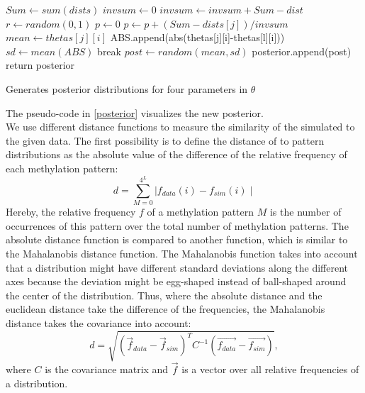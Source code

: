 \begin{algorithm}
\begin{algorithmic}
 
	\State $Sum \gets sum(dists)$
	\State $invsum \gets 0$
		\State $invsum \gets invsum + Sum - dist$
	\EndFor
	\State $r \gets random(0,1)$
	\State $p \gets 0$
		\State $p \gets p + (Sum - dists[j])/invsum$
			\State $mean \gets thetas[j][i]$
				\State ABS.append(abs(thetas[j][i]-thetas[l][i]))
			\EndFor
			\State $sd \gets mean(ABS)$
			\State break
		\EndIf
		\State $post \gets random(mean, sd)$
		\State posterior.append(post)
	\EndFor
\EndFor
\State return posterior
\EndProcedure
\end{algorithmic}
\caption{\label{posterior} Generates posterior distributions for four parameters in $\theta$}
\end{algorithm}
The pseudo-code in \ref{posterior} visualizes the new posterior.\\

We use different distance functions to measure the similarity of the simulated to the given data. The first possibility is to define the distance of to pattern distributions as the absolute value of the difference of the relative frequency of each  methylation pattern:
\[d = \sum^{4^L}_{M=0}{\mid f_{data}(i) - f_{sim}(i) \mid}\]
Hereby, the relative frequency $f$ of a methylation pattern $M$ is the number of occurrences of this pattern over the total number of methylation patterns.\newline
The absolute distance function is compared to another function, which is similar to the Mahalanobis distance function. The Mahalanobis function takes into account that a distribution might have different standard deviations along the different axes because the deviation might be egg-shaped instead of ball-shaped around the center of the distribution. Thus, where the absolute distance and the euclidean distance take the difference of the frequencies, the Mahalanobis distance takes the covariance into account:
\[d = \sqrt{(\vec{f}_{data}-\vec{f}_{sim})^T C^{-1} (\vec{f_{data}}-\vec{f_{sim}})},\]
where $C$ is the covariance matrix and $\vec{f}$ is a vector over all relative frequencies of a distribution.

